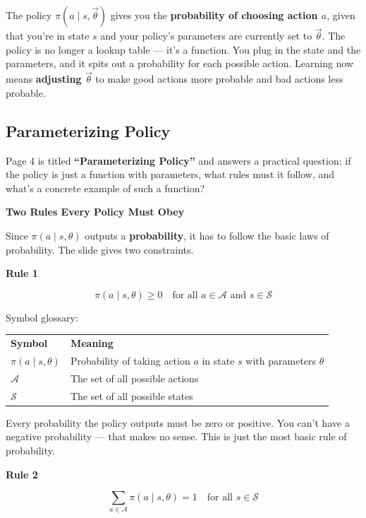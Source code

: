 \medskip

The policy $\pi(a \mid s, \vec{\theta})$ gives you the \textbf{probability of choosing action $a$}, given that you're in state $s$ and your policy's parameters are currently set to $\vec{\theta}$. The policy is no longer a lookup table --- it's a function. You plug in the state and the parameters, and it spits out a probability for each possible action. Learning now means \textbf{adjusting $\vec{\theta}$} to make good actions more probable and bad actions less probable.


\subsection{Parameterizing Policy}

Page 4 is titled \textbf{``Parameterizing Policy''} and answers a practical question: if the policy is just a function with parameters, what rules must it follow, and what's a concrete example of such a function?

\textbf{Two Rules Every Policy Must Obey}

Since $\pi(a \mid s, \theta)$ outputs a \textbf{probability}, it has to follow the basic laws of probability. The slide gives two constraints.

\textbf{Rule 1}

\[
\pi(a \mid s, \theta) \geq 0 \quad \text{for all } a \in \mathcal{A} \text{ and } s \in \mathcal{S}
\]

Symbol glossary:

\begin{tabular}{ll}
\textbf{Symbol} & \textbf{Meaning} \\[4pt]
$\pi(a \mid s, \theta)$ & Probability of taking action $a$ in state $s$ with parameters $\theta$ \\
$\mathcal{A}$ & The set of all possible actions \\
$\mathcal{S}$ & The set of all possible states \\
\end{tabular}

\medskip

Every probability the policy outputs must be zero or positive. You can't have a negative probability --- that makes no sense. This is just the most basic rule of probability.

\textbf{Rule 2}

\[
\sum_{a \in \mathcal{A}} \pi(a \mid s, \theta) = 1 \quad \text{for all } s \in \mathcal{S}
\]

